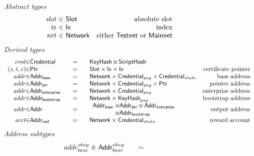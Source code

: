 \begin{figure*}[hbt]
  \emph{Abstract types}
  \begin{equation*}
    \begin{array}{r@{~\in~}lr}
      \var{slot} & \Slot & \text{absolute slot}\\
      \var{ix} & \Ix & \text{index}\\
      \var{net} & \Network & \text{either $\mathsf{Testnet}$ or $\mathsf{Mainnet}$}\\
    \end{array}
  \end{equation*}
  \emph{Derived types}
  \begin{equation*}
    \begin{array}{r@{\in}l@{\qquad=\qquad}lr}
      \var{cred} & \Credential & \KeyHash\uniondistinct\HashScr \\
      \var{(s,t,c)}
      & \Ptr
      & \Slot\times\Ix\times\Ix
      & \text{certificate pointer}
      \\
      \var{addr}
      & \AddrB
      & \Network\times\Credential_{pay}\times\Credential_{stake}
      & \text{base address}
      \\
      \var{addr}
      & \AddrP
      & \Network\times\Credential_{pay}\times\Ptr
      & \text{pointer address}
      \\
      \var{addr}
      & \AddrE
      & \Network\times\Credential_{pay}
      & \text{enterprise address}
      \\
      \var{addr}
      & \AddrBS
      & \Network\times\KeyHash_{pay}
      & \text{bootstrap address}
      \\
      \var{addr}
      & \Addr
      & \begin{array}{l@{~\uniondistinct}l}
          \AddrB & \AddrP \uniondistinct \AddrE
          \\
                 & \AddrBS
        \end{array}
      & \text{output address}
      \\
      \var{acct}
      & \AddrRWD
      & \Network\times\Credential_{stake}
      & \text{reward account}
      \\
    \end{array}
  \end{equation*}
  \emph{Address subtypes}
  \begin{equation*}
    \begin{array}{r@{~\in~}l@{\qquad=\qquad}lr}
      \var{addr^{vkey}_{base}}
                 & \Addr^{vkey}_{base}

\end{array}
\end{equation*}
\end{figure*}
